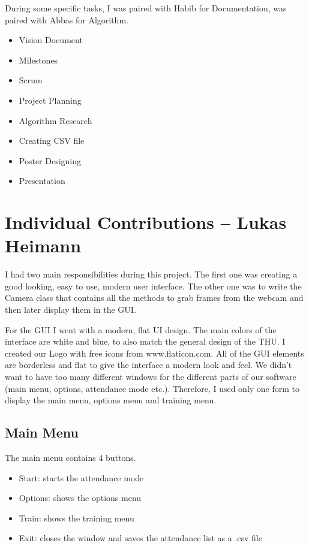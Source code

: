 \documentclass[12pt, a4paper]{article}
\begin{document}
During some specific tasks, I was paired with Habib for Documentation, was paired with Abbas for Algorithm. 
\begin{itemize}
\item Vision Document
\item Milestones 
\item Scrum 
\item Project Planning 
\item Algorithm Research 
\item Creating CSV file
\item Poster Designing
\item Presentation 
\end{itemize}



\newpage



\section{Individual Contributions – Lukas Heimann}
I had two main responsibilities during this project. The first one was creating a good looking, easy to use, modern user interface. The other one was to write the Camera class that contains all the methods to grab frames from the webcam and then later display them in the GUI.

For the GUI I went with a modern, flat UI design. The main colors of the interface are white and blue, to also match the general design of the THU. I created our Logo with free icons from www.flaticon.com.\cite{Logo1} \cite{Logo2} All of the GUI elements are borderless and flat to give the interface a modern look and feel. We didn’t want to have too many different windows for the different parts of our software (main menu, options, attendance mode etc.). Therefore, I used only one form to display the main menu, options menu and training menu.

\subsection{Main Menu}
The main menu contains 4 buttons.
\begin{itemize}
\item Start: starts the attendance mode
\item Options: shows the options menu
\item Train: shows the training menu
\item Exit: closes the window and saves the attendance list as a .csv file
\end{itemize}
\end{document}
